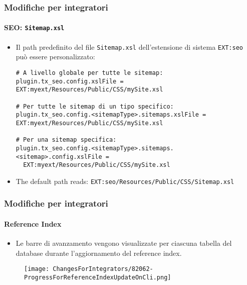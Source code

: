 \begin{frame}[fragile]
	\frametitle{Modifiche per integratori}
	\framesubtitle{SEO: \texttt{Sitemap.xsl}}

	\lstset{basicstyle=\tiny\ttfamily}

	\begin{itemize}
		\item Il path predefinito del file \texttt{Sitemap.xsl} dell'estensione di sistema
			\texttt{EXT:seo} può essere personalizzato:

\vspace{-0.4cm}
\begin{lstlisting}
# A livello globale per tutte le sitemap:
plugin.tx_seo.config.xslFile = EXT:myext/Resources/Public/CSS/mySite.xsl

# Per tutte le sitemap di un tipo specifico:
plugin.tx_seo.config.<sitemapType>.sitemaps.xslFile = EXT:myext/Resources/Public/CSS/mySite.xsl

# Per una sitemap specifica:
plugin.tx_seo.config.<sitemapType>.sitemaps.<sitemap>.config.xslFile =
  EXT:myext/Resources/Public/CSS/mySite.xsl
\end{lstlisting}

		\item The default path reads:\newline
			\smaller
				\texttt{EXT:seo/Resources/Public/CSS/Sitemap.xsl}
			\normalsize

	\end{itemize}

\end{frame}


\begin{frame}[fragile]
	\frametitle{Modifiche per integratori}
	\framesubtitle{Reference Index}

	\lstset{basicstyle=\tiny\ttfamily}

	\begin{itemize}
		\item Le barre di avanzamento vengono visualizzate per ciascuna tabella del database durante l'aggiornamento del reference index.
	\end{itemize}

	\begin{figure}
		\texttt{[image: ChangesForIntegrators/82062-ProgressForReferenceIndexUpdateOnCli.png]}
	\end{figure}

\end{frame}

